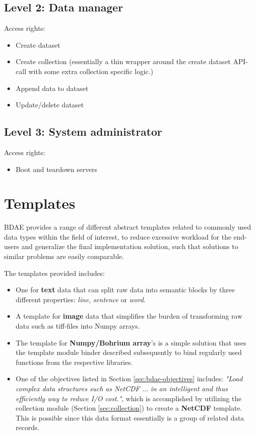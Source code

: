 \subsection{Level 2: Data manager}
Access rights:
\begin{itemize}
	\item Create dataset
	\item Create collection (essentially a thin wrapper around the create dataset API-call with some extra collection specific logic.)
	\item Append data to dataset
	\item Update/delete dataset
\end{itemize}

\subsection{Level 3: System administrator}
Access rights:
\begin{itemize}
	\item Boot and teardown servers
\end{itemize}

\section{Templates} \label{sec:templates}
BDAE provides a range of different abstract templates related to commonly used data types within the field of interest, to reduce excessive workload for the end-users and generalize the final implementation solution, such that solutions to similar problems are easily comparable.
\newline

\noindent
The templates provided includes:
\begin{itemize}
	\item One for \textbf{text} data that can split raw data into semantic blocks by three different properties: \textit{line}, \textit{sentence} or \textit{word}.
	\item A template for \textbf{image} data that simplifies the burden of transforming raw data such as tiff-files into Numpy arrays.
	\item The template for \textbf{Numpy/Bohrium array}'s is a simple solution that uses the template module binder described subsequently to bind regularly used functions from the respective libraries.
	\item One of the objectives listed in Section \ref{sec:bdae-objectives} includes: \textit{"Load complex data structures such as NetCDF $\ldots$ in an intelligent and thus efficiently way to reduce I/O cost."}, which is accomplished by utilizing the collection module (Section \ref{sec:collection}) to create a \textbf{NetCDF} template. This is possible since this data format essentially is a group of related data records. 
\end{itemize}

